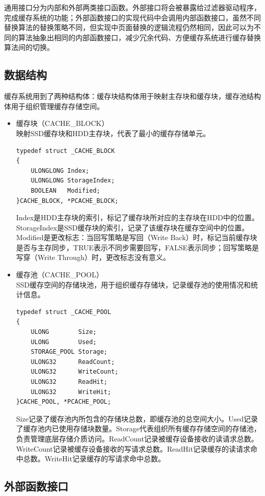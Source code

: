 通用接口分为内部和外部两类接口函数。外部接口将会被暴露给过滤器驱动程序，完成缓存系统的功能；外部函数接口的实现代码中会调用内部函数接口，虽然不同替换算法的替换策略不同，但实现中页面替换的逻辑流程仍然相同，因此可以为不同的算法抽象出相同的内部函数接口，减少冗余代码、方便缓存系统进行缓存替换算法间的切换。

\subsection{数据结构}

缓存系统用到了两种结构体：缓存块结构体用于映射主存块和缓存块，缓存池结构体用于组织管理缓存存储空间。

\begin{itemize}

\item 缓存块（CACHE\_BLOCK）
\\映射SSD缓存块和HDD主存块，代表了最小的缓存存储单元。
\begin{lstlisting}
typedef struct _CACHE_BLOCK
{
    ULONGLONG Index;
    ULONGLONG StorageIndex;
    BOOLEAN   Modified;
}CACHE_BLOCK, *PCACHE_BLOCK;
\end{lstlisting}
Index是HDD主存块的索引，标记了缓存块所对应的主存块在HDD中的位置。StorageIndex是SSD缓存块的索引，记录了该缓存块在缓存空间中的位置。Modified是更改标志：当回写策略是写回（Write Back）时，标记当前缓存块是否与主存同步，TRUE表示不同步需要回写，FALSE表示同步；回写策略是写穿（Write Through）时，更改标志没有意义。

\item 缓存池（CACHE\_POOL）
\\SSD缓存空间的存储块池，用于组织缓存存储块，记录缓存池的使用情况和统计信息。
\begin{lstlisting}
typedef struct _CACHE_POOL
{
    ULONG        Size;
    ULONG        Used;
    STORAGE_POOL Storage;
    ULONG32      ReadCount;
    ULONG32      WriteCount;
    ULONG32      ReadHit;
    ULONG32      WriteHit;
}CACHE_POOL, *PCACHE_POOL;
\end{lstlisting}
Size记录了缓存池内所包含的存储块总数，即缓存池的总空间大小。Used记录了缓存池内已使用存储块数量。Storage代表组织所有缓存存储空间的存储池，负责管理底层存储介质访问。ReadCount记录被缓存设备接收的读请求总数。WriteCount记录被缓存设备接收的写请求总数。ReadHit记录缓存的读请求命中总数。WriteHit记录缓存的写请求命中总数。

\end{itemize}

\subsection{外部函数接口}

